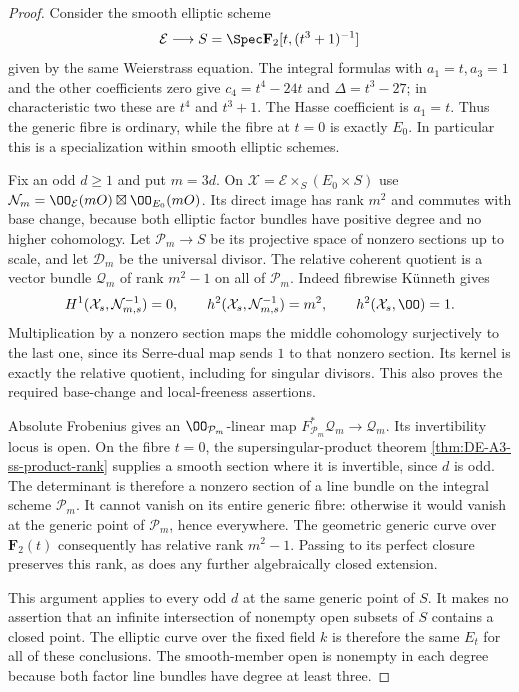 \begin{proof}
Consider the smooth elliptic scheme
\[
 \mathcal E\longrightarrow
 S=\Spec\mathbf F_2[t,(t^3+1)^{-1}]
\]
given by the same Weierstrass equation.  The integral formulas with
$a_1=t,a_3=1$ and the other coefficients zero give
$c_4=t^4-24t$ and $\Delta=t^3-27$; in characteristic two these are
$t^4$ and $t^3+1$.  The Hasse coefficient is $a_1=t$.
Thus the generic fibre is ordinary, while the fibre at $t=0$ is
exactly $E_0$.  In particular this is a specialization within smooth
elliptic schemes.

Fix an odd $d\ge1$ and put $m=3d$.  On
$\mathcal X=\mathcal E\times_S(E_0\times S)$ use
$\mathcal N_m=\OO_{\mathcal E}(mO)\boxtimes\OO_{E_0}(mO)$.
Its direct image has rank $m^2$ and commutes with base change,
because both elliptic factor bundles have positive degree and no
higher cohomology.  Let $\mathcal P_m\to S$ be its projective space
of nonzero sections up to scale, and let $\mathcal D_m$ be the
universal divisor.  The relative coherent quotient is a vector
bundle $\mathcal Q_m$ of rank $m^2-1$ on all of $\mathcal P_m$.
Indeed fibrewise K\"unneth gives
\[
 H^1(\mathcal X_s,\mathcal N_{m,s}^{-1})=0,\qquad
 h^2(\mathcal X_s,\mathcal N_{m,s}^{-1})=m^2,
 \qquad h^2(\mathcal X_s,\OO)=1.
\]
Multiplication by a nonzero section maps the middle cohomology
surjectively to the last one, since its Serre-dual map sends $1$
to that nonzero section.  Its kernel is exactly the relative
quotient, including for singular divisors.  This also proves
the required base-change and local-freeness assertions.

Absolute Frobenius gives an $\OO_{\mathcal P_m}$-linear map
$F_{\mathcal P_m}^*\mathcal Q_m\to\mathcal Q_m$.
Its invertibility locus is open.  On the fibre $t=0$, the
supersingular-product theorem
\ref{thm:DE-A3-ss-product-rank} supplies a smooth section where it
is invertible, since $d$ is odd.  The determinant is therefore
a nonzero section of a line bundle on the integral scheme
$\mathcal P_m$.  It cannot vanish on its entire generic fibre:
otherwise it would vanish at the generic point of
$\mathcal P_m$, hence everywhere.  The geometric generic curve
over $\mathbf F_2(t)$ consequently has relative rank $m^2-1$.
Passing to its perfect closure preserves this rank, as does any
further algebraically closed extension.

This argument applies to every odd $d$ at the same generic point
of $S$.  It makes no assertion that an infinite intersection of
nonempty open subsets of $S$ contains a closed point.  The
elliptic curve over the fixed field $k$ is therefore the same
$E_t$ for all of these conclusions.  The smooth-member open is
nonempty in each degree because both factor line bundles have
degree at least three.


\end{proof}

